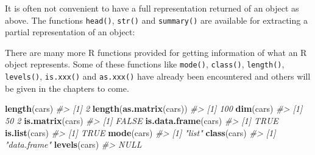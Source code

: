 \documentclass[
]{book}
\newenvironment{Shaded}{\begin{snugshade}}{\end{snugshade}}
\newcommand{\CommentTok}[1]{\textcolor[rgb]{0.56,0.35,0.01}{\textit{#1}}}
\newcommand{\FunctionTok}[1]{\textcolor[rgb]{0.13,0.29,0.53}{\textbf{#1}}}
\newcommand{\NormalTok}[1]{#1}
\begin{document}
It is often not convenient to have a full representation returned of an object as above. The functions \texttt{head()}, \texttt{str()} and \texttt{summary()} are available for extracting a partial representation of an object:

\begin{Shaded}
\end{Shaded}

There are many more R functions provided for getting information of what an R object represents. Some of these functions like \texttt{mode()}, \texttt{class()}, \texttt{length()}, \texttt{levels()}, \texttt{is.xxx()} and \texttt{as.xxx()} have already been encountered and others will be given in the chapters to come.

\begin{Shaded}
\begin{Highlighting}[]
\FunctionTok{length}\NormalTok{(cars) }
\CommentTok{\#\textgreater{} [1] 2}
\FunctionTok{length}\NormalTok{(}\FunctionTok{as.matrix}\NormalTok{(cars))}
\CommentTok{\#\textgreater{} [1] 100}
\FunctionTok{dim}\NormalTok{(cars)}
\CommentTok{\#\textgreater{} [1] 50  2}
\FunctionTok{is.matrix}\NormalTok{(cars)}
\CommentTok{\#\textgreater{} [1] FALSE}
\FunctionTok{is.data.frame}\NormalTok{(cars)}
\CommentTok{\#\textgreater{} [1] TRUE}
\FunctionTok{is.list}\NormalTok{(cars)}
\CommentTok{\#\textgreater{} [1] TRUE}
\FunctionTok{mode}\NormalTok{(cars)}
\CommentTok{\#\textgreater{} [1] "list"}
\FunctionTok{class}\NormalTok{(cars)}
\CommentTok{\#\textgreater{} [1] "data.frame"}
\FunctionTok{levels}\NormalTok{(cars)}
\CommentTok{\#\textgreater{} NULL}
\end{Highlighting}
\end{Shaded}
\end{document}
